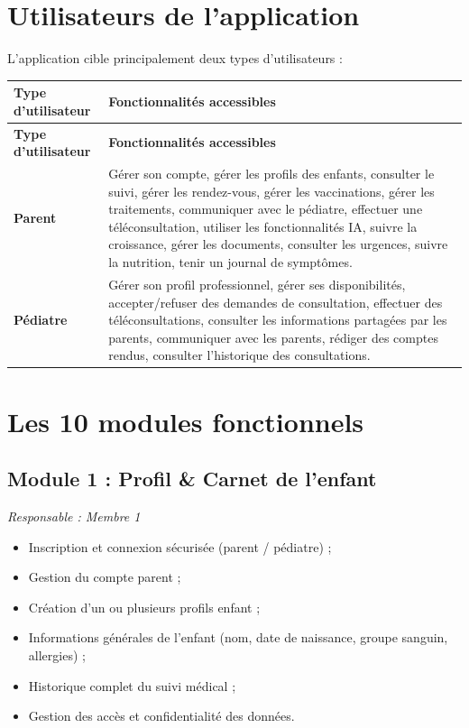 \documentclass[11pt,a4paper]{article}
\newcommand{\headrow}{\rowcolor{navy}}
\newcommand{\tblhead}[1]{\color{white}\textbf{#1}}
\begin{document}
\section{Utilisateurs de l'application}

L'application cible principalement deux types d'utilisateurs :

\renewcommand{\arraystretch}{1.4}
\begin{longtable}{|p{4cm}|p{9cm}|}
\hline
\headrow \tblhead{Type d'utilisateur} & \tblhead{Fonctionnalités accessibles} \\
\hline
\endfirsthead
\hline
\headrow \tblhead{Type d'utilisateur} & \tblhead{Fonctionnalités accessibles} \\
\hline
\endhead
\textbf{Parent} &
Gérer son compte, gérer les profils des enfants, consulter le suivi, gérer les rendez-vous, gérer les vaccinations, gérer les traitements, communiquer avec le pédiatre, effectuer une téléconsultation, utiliser les fonctionnalités IA, suivre la croissance, gérer les documents, consulter les urgences, suivre la nutrition, tenir un journal de symptômes. \\
\hline
\rowcolor{rowgrey}
\textbf{Pédiatre} &
Gérer son profil professionnel, gérer ses disponibilités, accepter/refuser des demandes de consultation, effectuer des téléconsultations, consulter les informations partagées par les parents, communiquer avec les parents, rédiger des comptes rendus, consulter l'historique des consultations. \\
\hline
\end{longtable}

\section{Les 10 modules fonctionnels}

\subsection{Module 1 : Profil \& Carnet de l'enfant}

\textit{Responsable : Membre 1}

\begin{itemize}
  \item Inscription et connexion sécurisée (parent / pédiatre) ;
  \item Gestion du compte parent ;
  \item Création d'un ou plusieurs profils enfant ;
  \item Informations générales de l'enfant (nom, date de naissance, groupe sanguin, allergies) ;
  \item Historique complet du suivi médical ;
  \item Gestion des accès et confidentialité des données.
\end{itemize}
\end{document}

